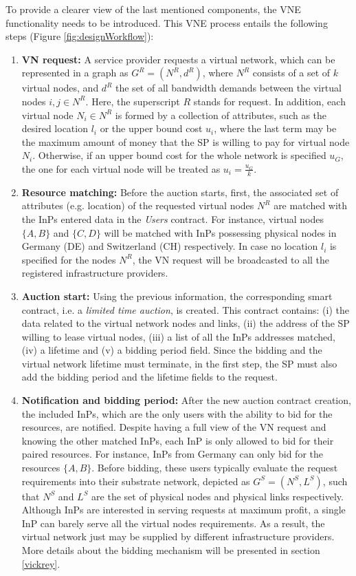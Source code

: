 To provide a clearer view of the last mentioned components, the VNE functionality needs to be introduced. This VNE process entails the following steps (Figure \ref{fig:designWorkflow}):

\begin{enumerate}
    \item \textbf{VN request:} A service provider requests a virtual network, which can be represented in a graph as $G^{R} = (N^{R} , d^{R})$, where $N^{R}$ consists of a set of $k$ virtual nodes, and $d^{R}$ the set of all bandwidth demands between the virtual nodes $i,j \in N^{R}$. Here, the superscript $R$ stands for request. In addition, each virtual node $N_i \in N^{R}$ is formed by a collection of attributes, such as the desired location $l_{i}$ or the upper bound cost $u_{i}$, where the last term may be the maximum amount of money that the SP is willing to pay for virtual node $N_i$. Otherwise, if an upper bound cost for the whole network is specified $u_{G}$, the one for each virtual node will be treated as $u_{i} = \frac{u_{G}}{k}$.
    \item \textbf{Resource matching:} Before the auction starts, first, the associated set of attributes (e.g. location) of the requested virtual nodes $N^{R}$ are matched with the InPs entered data in the \textit{Users} contract. For instance, virtual nodes $\{A,B\}$ and $\{C,D\}$ will be matched with InPs possessing physical nodes in Germany (DE) and Switzerland (CH) respectively. In case no location $l_{i}$ is specified for the nodes $N^{R}$, the VN request will be broadcasted to all the registered infrastructure providers.
	\item \textbf{Auction start:} Using the previous information, the corresponding smart contract, i.e. a \textit{limited time auction}, is created. This contract contains: (i) the data related to the virtual network nodes and links, (ii) the address of the SP willing to lease virtual nodes, (iii) a list of all the InPs addresses matched, (iv) a lifetime and (v) a bidding period field. Since the bidding and the virtual network lifetime must terminate, in the first step, the SP must also add the bidding period and the lifetime fields to the request.
 	\item \textbf{Notification and bidding period:} After the new auction contract creation, the included InPs, which are the only users with the ability to bid for the resources, are notified. Despite having a full view of the VN request and knowing the other matched InPs, each InP is only allowed to bid for their paired resources. For instance, InPs from Germany can only bid for the resources $\{A,B\}$. Before bidding, these users typically evaluate the request requirements into their substrate network, depicted as $G^{S} = (N^{S} , L^{S})$, such that $N^{S}$ and $L^{S}$ are the set of physical nodes and physical links respectively. Although InPs are interested in serving requests at maximum profit, a single InP can barely serve all the virtual nodes requirements. As a result, the virtual network just may be supplied by different infrastructure providers. More details about the bidding mechanism will be presented in section \ref{vickrey}.

\end{enumerate}
